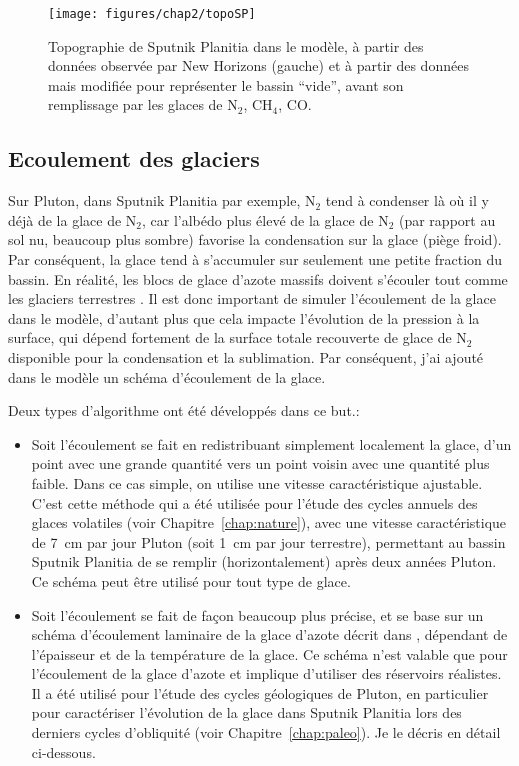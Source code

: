 \begin{figure}[!h]
\begin{center} 
	\texttt{[image: figures/chap2/topoSP]}
\end{center} 
\caption{Topographie de Sputnik Planitia dans le modèle, à partir des données observée par New Horizons (gauche) et à partir des données mais modifiée pour représenter le bassin ``vide'', avant son remplissage par les glaces de N$_2$, CH$_4$, CO.} 
\label{topoSP}
\end{figure}

\subsection{Ecoulement des glaciers}

Sur Pluton, dans Sputnik Planitia par exemple, N$_2$ tend à condenser là où il y déjà de la glace de N$_2$, car l'albédo plus élevé de la glace de N$_2$ (par rapport au sol nu, beaucoup plus sombre) favorise la condensation sur la glace (piège froid). Par conséquent, la glace tend à s'accumuler sur seulement une petite fraction du bassin. En réalité, les blocs de glace d’azote massifs doivent s’écouler tout comme les glaciers terrestres \citep{Moor:16}. Il est donc important de simuler l’écoulement de la glace dans le modèle, d’autant plus que cela impacte l’évolution de la pression à la surface, qui dépend fortement de la surface totale recouverte de glace de N$_2$ disponible pour la condensation et la sublimation. 
Par conséquent, j'ai ajouté dans le modèle un schéma d’écoulement de la glace.

Deux types d'algorithme ont été développés dans ce but.: 
\begin{itemize}
\item Soit l’écoulement se fait en redistribuant simplement localement la glace, d’un point avec une grande quantité vers un point voisin avec une quantité plus faible. Dans ce cas simple, on utilise une vitesse caractéristique ajustable. C’est cette méthode qui a été utilisée pour l’étude des cycles annuels des glaces volatiles (voir Chapitre~\ref{chap:nature}), avec une vitesse caractéristique de 7~cm par jour Pluton (soit 1~cm par jour terrestre), permettant au bassin Sputnik Planitia de se remplir (horizontalement) après deux années Pluton. Ce schéma peut être utilisé pour tout type de glace.
\item Soit l’écoulement se fait de façon beaucoup plus précise, et se base sur un schéma d’écoulement laminaire de la glace d’azote décrit dans \citet{Umur:17}, dépendant de l’épaisseur et de la température de la glace. Ce schéma n’est valable que pour l’écoulement de la glace d’azote et implique d’utiliser des réservoirs réalistes. Il a été utilisé pour l’étude des cycles géologiques de Pluton, en particulier pour caractériser l’évolution de la glace dans Sputnik Planitia lors des derniers cycles d’obliquité (voir Chapitre~\ref{chap:paleo}). Je le décris en détail ci-dessous.
\end{itemize}

